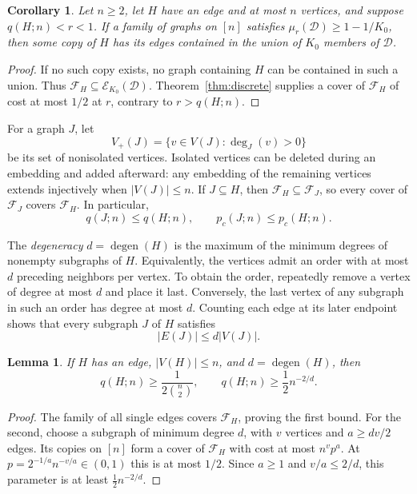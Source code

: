 \documentclass[11pt]{article}
\newtheorem{lemma}[theorem]{Lemma}
\newtheorem{corollary}[theorem]{Corollary}
\theoremstyle{remark}
\numberwithin{equation}{section}
\newcommand{\calD}{\mathcal D}
\newcommand{\calF}{\mathcal F}
\DeclareMathOperator{\degen}{degen}
\begin{document}
\begin{corollary}\label{cor:typical-cover}
Let $n\geq2$, let $H$ have an edge and at most $n$ vertices,
and suppose $q(H;n)<r<1$. If a family of graphs on $[n]$
satisfies $\mu_r(\calD)\geq1-1/K_0$, then some copy of $H$
has its edges contained in the union of $K_0$ members of $\calD$.
\end{corollary}
\begin{proof}
If no such copy exists, no graph containing $H$ can be contained
in such a union. Thus $\calF_H\subseteq\mathcal E_{K_0}(\calD)$.
Theorem~\ref{thm:discrete} supplies a cover of $\calF_H$ of
cost at most $1/2$ at $r$, contrary to $r>q(H;n)$.
\end{proof}

For a graph $J$, let
\[
 V_+(J)=\{v\in V(J):\deg_J(v)>0\}
\]
be its set of nonisolated vertices. Isolated vertices can be
deleted during an embedding and added afterward: any embedding
of the remaining vertices extends injectively when $|V(J)|\leq n$.
If $J\subseteq H$, then $\calF_H\subseteq\calF_J$, so every
cover of $\calF_J$ covers $\calF_H$. In particular,
\begin{equation}\label{eq:monotonicity}
 q(J;n)\leq q(H;n),\qquad p_c(J;n)\leq p_c(H;n).
\end{equation}

The \emph{degeneracy} $d=\degen(H)$ is the maximum of the
minimum degrees of nonempty subgraphs of $H$. Equivalently,
the vertices admit an order with at most $d$ preceding neighbors
per vertex. To obtain the order, repeatedly remove a vertex of
degree at most $d$ and place it last. Conversely, the last vertex
of any subgraph in such an order has degree at most $d$.
Counting each edge at its later endpoint shows that every
subgraph $J$ of $H$ satisfies
\begin{equation}\label{eq:edge-bound}
 |E(J)|\leq d|V(J)|.
\end{equation}

\begin{lemma}\label{lem:q-lower}
If $H$ has an edge, $|V(H)|\leq n$, and $d=\degen(H)$, then
\begin{equation}\label{eq:q-lower}
 q(H;n)\geq\frac1{2\binom n2},\qquad
 q(H;n)\geq\frac12 n^{-2/d}.
\end{equation}
\end{lemma}
\begin{proof}
The family of all single edges covers $\calF_H$, proving the
first bound. For the second, choose a subgraph of minimum degree
$d$, with $v$ vertices and $a\geq dv/2$ edges. Its copies on
$[n]$ form a cover of $\calF_H$ with cost at most $n^vp^a$.
At $p=2^{-1/a}n^{-v/a}\in(0,1)$ this is at most $1/2$.
Since $a\geq1$ and $v/a\leq2/d$, this parameter is at least
$\frac12n^{-2/d}$.
\end{proof}
\end{document}
